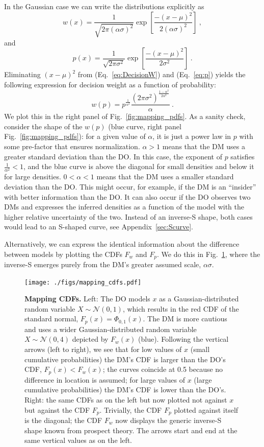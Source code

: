 \documentclass[a4paper, 12pt]{article}
\newcommand{\elabel}[1]{\label{eq:#1}}
\newcommand{\eref}[1]{(Eq.~\ref{eq:#1})}
\newcommand{\flabel}[1]{\label{fig:#1}}
\newcommand{\fref}[1]{Fig.~\ref{fig:#1}}
\newcommand{\Appref}[1]{Appendix~\ref{sec:#1}}
\newcommand{\be}{\begin{equation}}
\newcommand{\ee}{\end{equation}}
\newcommand{\ND}{\mathcal{N}} %
\begin{document}
In the Gaussian case we can write the distributions explicitly as
\be
w(x)=\frac{1}{\sqrt{2\pi (\alpha \sigma)^2}}\exp\left[\frac{-(x -\mu )^2}{2 (\alpha \sigma)^2}\right]~,
\elabel{DecisionW}
\ee
and
\be
p(x)=\frac{1}{\sqrt{2\pi \sigma^2}}\exp\left[\frac{-(x -\mu )^2}{2 \sigma^2}\right] ~.
\elabel{p}
\ee
Eliminating $(x-\mu)^2$ from \eref{DecisionW} and \eref{p} yields the following expression for decision weight as a function of probability:
\be
w(p)= p^{\frac{1}{\alpha^2}} \frac{\left(2\pi\sigma^2\right)^{\frac{1-\alpha^2}{2\alpha^2}}}{\alpha} ~.
\elabel{w_of_p}
\ee
We plot this in the right panel of \fref{mapping_pdfs}. As a sanity check, consider the shape of the $w(p)$ (blue curve, right panel \fref{mapping_pdfs}): for a given value of $\alpha$, it is just a power law in $p$ with some pre-factor that ensures normalization. $\alpha>1$ means that the DM uses a greater standard deviation than the DO. In this case, the exponent of $p$ satisfies $\frac{1}{\alpha^2}<1$, and the blue curve is above the diagonal for small densities and below it for large densities. $0<\alpha<1$ means that the DM uses a smaller standard deviation than the DO.
This might occur, for example, if the DM is an ``insider'' with better information than the DO.
It can also occur if the DO observes two DMs and expresses the inferred densities as a function of the model with the higher relative uncertainty of the two.
Instead of an inverse-S shape, both cases would lead to an S-shaped curve, see \Appref{Scurve}.

Alternatively, we can express the identical information about the difference between models by plotting the CDFs $F_w$ and $F_p$. We do this in \fref{mapping_cdfs}, where the inverse-S emerges purely from the DM's greater assumed scale, $\alpha \sigma$.
\begin{figure}[!htb]
\centering
\texttt{[image: ./figs/mapping\_cdfs.pdf]}
\caption{\textbf{Mapping CDFs.}
Left: The DO models $x$ as a Gaussian-distributed random variable $X \sim \ND(0,1)$, which results in the red CDF of the standard normal, $F_p(x) = \Phi_{0,1}(x)$. The DM is more cautious and uses a wider Gaussian-distributed random variable $X \sim \ND(0,4)$ depicted by $F_w(x)$ (blue).
%
Following the vertical arrows (left to right), we see that for low values of $x$ (small cumulative probabilities) the DM's CDF is larger than the DO's CDF, $F_p(x) < F_w(x)$; the curves coincide at 0.5 because no difference in location is assumed; for large values of $x$ (large cumulative probabilities) the DM's CDF is lower than the DO's.
Right: the same CDFs as on the left but now plotted not against $x$ but against the CDF $F_p$. Trivially, the CDF $F_p$ plotted against itself is the diagonal; the CDF $F_w$ now displays the generic inverse-S shape known from prospect theory. The arrows start and end at the same vertical values as on the left.
}
\flabel{mapping_cdfs}
\end{figure}
\end{document}

